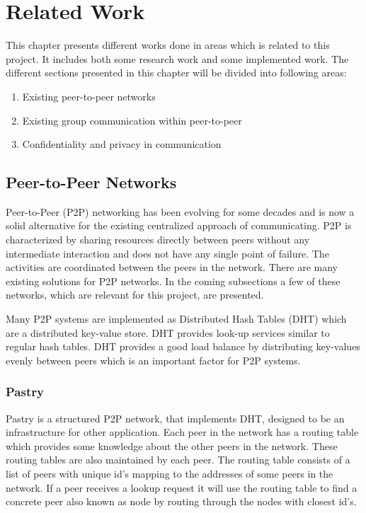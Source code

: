 \chapter{Related Work}
\label{cha:related-work}
This chapter presents different works done in areas which is related to this project. It includes both some research work and some implemented work. 
The different sections presented in this chapter will be divided into following areas:
\begin{enumerate}
	\item Existing peer-to-peer networks
	\item Existing group communication within peer-to-peer  
	\item Confidentiality and privacy in communication
\end{enumerate}

\section{Peer-to-Peer Networks}
\label{sec:p2p-networks}
Peer-to-Peer (P2P) networking has been evolving for some decades and is now a solid alternative for the existing centralized approach of communicating.
P2P is characterized by sharing resources directly between peers without any intermediate interaction and does not have any single point of failure. The activities are coordinated between the peers in the network.
There are many existing solutions for P2P networks. In the coming subsections a few of these networks, which are relevant for this project, are presented. 

Many P2P systems are implemented as Distributed Hash Tables (DHT) which are a distributed key-value store.
DHT provides look-up services similar to regular hash tables.
DHT provides a good load balance by distributing key-values evenly between peers which is an important factor for P2P systems.

\subsection{Pastry}
Pastry is a structured P2P network, that implements DHT, designed to be an infrastructure for other application. 
Each peer in the network has a routing table which provides some knowledge about the other peers in the network. These routing tables are also maintained by each peer.
The routing table consists of a list of peers with unique id's mapping to the addresses of some peers in the network.
If a peer receives a lookup request it will use the routing table to find a concrete peer also known as node by routing through the nodes with closest id's.

